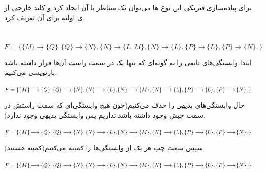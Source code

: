 \documentclass{article}
\begin{document}
\subsection{}
برای پیاده‌سازی فیزیکی این نوع ها می‌توان یک  متناظر با آن  ایجاد کرد و کلید خارجی از ی اولیه برای آن تعریف کرد.

\section{}%
\begin{latin}
$
F=
\{
	\{M\}\longrightarrow\{Q\},
	\{Q\}\longrightarrow\{N\},
	\{N\}\longrightarrow\{L, M\},
	\{N\}\longrightarrow\{L\},
	\{P\}\longrightarrow\{L\},
	\{P\}\longrightarrow\{N\},
\}
$
\end{latin}
ابتدا وابستگی‌های تابعی را به گونه‌ای که تنها یک  در سمت راست آن‌ها قرار داشته باشد بازنویسی می‌کنیم.
\begin{latin}
$
F=\\
\{\\
	\{M\}\longrightarrow\{Q\},\\
	\{Q\}\longrightarrow\{N\},\\
	\{N\}\longrightarrow\{L\},\\
	\{N\}\longrightarrow\{M\},\\
	\{N\}\longrightarrow\{L\},\\
	\{P\}\longrightarrow\{L\},\\
	\{P\}\longrightarrow\{N\},\\
\}
$
\end{latin}
حال وابستگی‌های بدیهی را حذف می‌کنیم(چون هیچ وابستگی‌ای که سمت راستش در سمت چپش وجود داشته باشد نداریم پس وابستگی بدیهی وجود ندارد).
\begin{latin}
$
F=\\
\{\\
	\{M\}\longrightarrow\{Q\},\\
	\{Q\}\longrightarrow\{N\},\\
	\{N\}\longrightarrow\{L\},\\
	\{N\}\longrightarrow\{M\},\\
	\{N\}\longrightarrow\{L\},\\
	\{P\}\longrightarrow\{L\},\\
	\{P\}\longrightarrow\{N\},\\
\}
$
\end{latin}

سپس سمت چپ هر یک از وابستگی‌ها را کمینه می‌کنیم(کمینه هستند).
\begin{latin}
$
F=\\
\{\\
	\{M\}\longrightarrow\{Q\},\\
	\{Q\}\longrightarrow\{N\},\\
	\{N\}\longrightarrow\{L\},\\
	\{N\}\longrightarrow\{M\},\\
	\{N\}\longrightarrow\{L\},\\
	\{P\}\longrightarrow\{L\},\\
	\{P\}\longrightarrow\{N\},\\
\}
$
\end{latin}
\end{document}
